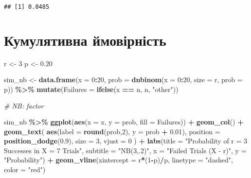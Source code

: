 \documentclass[
  10pt,
]{article}
\newenvironment{Shaded}{\begin{snugshade}}{\end{snugshade}}
\newcommand{\AttributeTok}[1]{\textcolor[rgb]{0.13,0.29,0.53}{#1}}
\newcommand{\CommentTok}[1]{\textcolor[rgb]{0.56,0.35,0.01}{\textit{#1}}}
\newcommand{\DecValTok}[1]{\textcolor[rgb]{0.00,0.00,0.81}{#1}}
\newcommand{\FloatTok}[1]{\textcolor[rgb]{0.00,0.00,0.81}{#1}}
\newcommand{\FunctionTok}[1]{\textcolor[rgb]{0.13,0.29,0.53}{\textbf{#1}}}
\newcommand{\NormalTok}[1]{#1}
\newcommand{\OtherTok}[1]{\textcolor[rgb]{0.56,0.35,0.01}{#1}}
\newcommand{\SpecialCharTok}[1]{\textcolor[rgb]{0.81,0.36,0.00}{\textbf{#1}}}
\newcommand{\StringTok}[1]{\textcolor[rgb]{0.31,0.60,0.02}{#1}}
\begin{document}
\begin{verbatim}
## [1] 0.0485
\end{verbatim}

\newpage

\hypertarget{ux43aux443ux43cux443ux43bux44fux442ux438ux432ux43dux430-ux439ux43cux43eux432ux456ux440ux43dux456ux441ux442ux44c}{%
\section{Кумулятивна
ймовірність}\label{ux43aux443ux43cux443ux43bux44fux442ux438ux432ux43dux430-ux439ux43cux43eux432ux456ux440ux43dux456ux441ux442ux44c}}

\begin{Shaded}
\begin{Highlighting}[]
\NormalTok{r }\OtherTok{\textless{}{-}} \DecValTok{3}
\NormalTok{p }\OtherTok{\textless{}{-}} \FloatTok{0.20}

\NormalTok{sim\_nb }\OtherTok{\textless{}{-}} \FunctionTok{data.frame}\NormalTok{(}\AttributeTok{x =} \DecValTok{0}\SpecialCharTok{:}\DecValTok{20}\NormalTok{, }\AttributeTok{prob =} \FunctionTok{dnbinom}\NormalTok{(}\AttributeTok{x =} \DecValTok{0}\SpecialCharTok{:}\DecValTok{20}\NormalTok{, }\AttributeTok{size =}\NormalTok{ r, }\AttributeTok{prob =}\NormalTok{ p)) }\SpecialCharTok{\%\textgreater{}\%}
  \FunctionTok{mutate}\NormalTok{(}\AttributeTok{Failures =} \FunctionTok{ifelse}\NormalTok{(x }\SpecialCharTok{==}\NormalTok{ n, n, }\StringTok{"other"}\NormalTok{)) }

\CommentTok{\# NB: factor}

\NormalTok{sim\_nb }\SpecialCharTok{\%\textgreater{}\%}
\FunctionTok{ggplot}\NormalTok{(}\FunctionTok{aes}\NormalTok{(}\AttributeTok{x =}\NormalTok{ x, }\AttributeTok{y =}\NormalTok{ prob, }\AttributeTok{fill =}\NormalTok{ Failures)) }\SpecialCharTok{+}
  \FunctionTok{geom\_col}\NormalTok{() }\SpecialCharTok{+}
  \FunctionTok{geom\_text}\NormalTok{(}
    \FunctionTok{aes}\NormalTok{(}\AttributeTok{label =} \FunctionTok{round}\NormalTok{(prob,}\DecValTok{2}\NormalTok{), }\AttributeTok{y =}\NormalTok{ prob }\SpecialCharTok{+} \FloatTok{0.01}\NormalTok{),}
    \AttributeTok{position =} \FunctionTok{position\_dodge}\NormalTok{(}\FloatTok{0.9}\NormalTok{),}
    \AttributeTok{size =} \DecValTok{3}\NormalTok{,}
    \AttributeTok{vjust =} \DecValTok{0}
\NormalTok{  ) }\SpecialCharTok{+}
  \FunctionTok{labs}\NormalTok{(}\AttributeTok{title =} \StringTok{"Probability of r = 3 Successes in X = 7 Trials"}\NormalTok{,}
       \AttributeTok{subtitle =} \StringTok{"NB(3,.2)"}\NormalTok{,}
       \AttributeTok{x =} \StringTok{"Failed Trials (X {-} r)"}\NormalTok{,}
       \AttributeTok{y =} \StringTok{"Probability"}\NormalTok{)  }\SpecialCharTok{+}
  \FunctionTok{geom\_vline}\NormalTok{(}\AttributeTok{xintercept =}\NormalTok{ r}\SpecialCharTok{*}\NormalTok{(}\DecValTok{1}\SpecialCharTok{{-}}\NormalTok{p)}\SpecialCharTok{/}\NormalTok{p, }\AttributeTok{linetype =} \StringTok{"dashed"}\NormalTok{, }\AttributeTok{color =} \StringTok{"red"}\NormalTok{)}
\end{Highlighting}
\end{Shaded}
\end{document}
